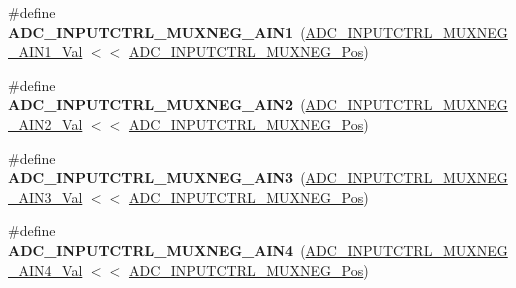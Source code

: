 \begin{DoxyCompactItemize}
\item 
\hypertarget{group___s_a_m_l21___a_d_c_ga99b8ee6222292abd226a9768c534fee1}{}\#define {\bfseries A\+D\+C\+\_\+\+I\+N\+P\+U\+T\+C\+T\+R\+L\+\_\+\+M\+U\+X\+N\+E\+G\+\_\+\+A\+I\+N1}~(\hyperlink{group___s_a_m_l21___a_d_c_ga65c4031252e29b801ab725e831297c7f}{A\+D\+C\+\_\+\+I\+N\+P\+U\+T\+C\+T\+R\+L\+\_\+\+M\+U\+X\+N\+E\+G\+\_\+\+A\+I\+N1\+\_\+\+Val} $<$$<$ \hyperlink{group___s_a_m_l21___a_d_c_ga47f933ef105812dd56ccffab8f7a0877}{A\+D\+C\+\_\+\+I\+N\+P\+U\+T\+C\+T\+R\+L\+\_\+\+M\+U\+X\+N\+E\+G\+\_\+\+Pos})\label{group___s_a_m_l21___a_d_c_ga99b8ee6222292abd226a9768c534fee1}

\item 
\hypertarget{group___s_a_m_l21___a_d_c_ga4dbfc3eb4a0e1582c0abc136ea6b01b7}{}\#define {\bfseries A\+D\+C\+\_\+\+I\+N\+P\+U\+T\+C\+T\+R\+L\+\_\+\+M\+U\+X\+N\+E\+G\+\_\+\+A\+I\+N2}~(\hyperlink{group___s_a_m_l21___a_d_c_ga09e7cbeacb0e375e6e11b4b411581ab2}{A\+D\+C\+\_\+\+I\+N\+P\+U\+T\+C\+T\+R\+L\+\_\+\+M\+U\+X\+N\+E\+G\+\_\+\+A\+I\+N2\+\_\+\+Val} $<$$<$ \hyperlink{group___s_a_m_l21___a_d_c_ga47f933ef105812dd56ccffab8f7a0877}{A\+D\+C\+\_\+\+I\+N\+P\+U\+T\+C\+T\+R\+L\+\_\+\+M\+U\+X\+N\+E\+G\+\_\+\+Pos})\label{group___s_a_m_l21___a_d_c_ga4dbfc3eb4a0e1582c0abc136ea6b01b7}

\item 
\hypertarget{group___s_a_m_l21___a_d_c_gafac29260e1c6509ce61260575c4d380c}{}\#define {\bfseries A\+D\+C\+\_\+\+I\+N\+P\+U\+T\+C\+T\+R\+L\+\_\+\+M\+U\+X\+N\+E\+G\+\_\+\+A\+I\+N3}~(\hyperlink{group___s_a_m_l21___a_d_c_ga7e31bc15fe6f1320232a1c6e96082094}{A\+D\+C\+\_\+\+I\+N\+P\+U\+T\+C\+T\+R\+L\+\_\+\+M\+U\+X\+N\+E\+G\+\_\+\+A\+I\+N3\+\_\+\+Val} $<$$<$ \hyperlink{group___s_a_m_l21___a_d_c_ga47f933ef105812dd56ccffab8f7a0877}{A\+D\+C\+\_\+\+I\+N\+P\+U\+T\+C\+T\+R\+L\+\_\+\+M\+U\+X\+N\+E\+G\+\_\+\+Pos})\label{group___s_a_m_l21___a_d_c_gafac29260e1c6509ce61260575c4d380c}

\item 
\hypertarget{group___s_a_m_l21___a_d_c_ga1a1e92068cde5aa739d482214ef6839f}{}\#define {\bfseries A\+D\+C\+\_\+\+I\+N\+P\+U\+T\+C\+T\+R\+L\+\_\+\+M\+U\+X\+N\+E\+G\+\_\+\+A\+I\+N4}~(\hyperlink{group___s_a_m_l21___a_d_c_ga152c475597bce7f68aaf5844e5c9c1b2}{A\+D\+C\+\_\+\+I\+N\+P\+U\+T\+C\+T\+R\+L\+\_\+\+M\+U\+X\+N\+E\+G\+\_\+\+A\+I\+N4\+\_\+\+Val} $<$$<$ \hyperlink{group___s_a_m_l21___a_d_c_ga47f933ef105812dd56ccffab8f7a0877}{A\+D\+C\+\_\+\+I\+N\+P\+U\+T\+C\+T\+R\+L\+\_\+\+M\+U\+X\+N\+E\+G\+\_\+\+Pos})\label{group___s_a_m_l21___a_d_c_ga1a1e92068cde5aa739d482214ef6839f}


\end{DoxyCompactItemize}
